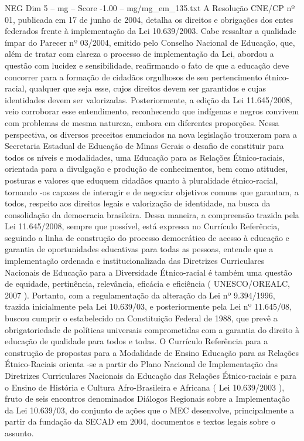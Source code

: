 \begin{textsample}{NEG Dim 5 – mg – Score -1.00 – mg/mg\_em\_135.txt}
A Resolução CNE/CP nº 01, publicada em 17 de junho de 2004, detalha os direitos e obrigações dos entes federados frente à implementação da Lei 10.639/2003.
Cabe ressaltar a qualidade ímpar do Parecer nº 03/2004, emitido pelo Conselho Nacional de Educação, que, além de tratar com clareza o processo de implementação da Lei, abordou a questão com lucidez e sensibilidade, reafirmando o fato de que a educação deve concorrer para a formação de cidadãos orgulhosos de seu pertencimento étnico-racial, qualquer que seja esse, cujos direitos devem ser garantidos e cujas identidades devem ser valorizadas.
Posteriormente, a edição da Lei 11.645/2008, veio corroborar esse entendimento, reconhecendo que indígenas e negros convivem com problemas de mesma natureza, embora em diferentes proporções.
Nessa perspectiva, os diversos preceitos enunciados na nova legislação trouxeram para a Secretaria Estadual de Educação de Minas Gerais o desafio de constituir para todos os níveis e modalidades, uma Educação para as Relações Étnico-raciais, orientada para a divulgação e produção de conhecimentos, bem como atitudes, posturas e valores que eduquem cidadãos quanto à pluralidade étnico-racial, tornando -os capazes de interagir e de negociar objetivos comuns que garantam, a todos, respeito aos direitos legais e valorização de identidade, na busca da consolidação da democracia brasileira.
Dessa maneira, a compreensão trazida pela Lei 11.645/2008, sempre que possível, está expressa no Currículo Referência, seguindo a linha de construção do processo democrático de acesso à educação e garantia de oportunidades educativas para todas as pessoas, entende que a implementação ordenada e institucionalizada das Diretrizes Curriculares Nacionais de Educação para a Diversidade Étnico-racial é também uma questão de equidade, pertinência, relevância, eficácia e eficiência ( UNESCO/OREALC, 2007 ).
Portanto, com a regulamentação da alteração da Lei nº 9.394/1996, trazida inicialmente pela Lei 10.639/03, e posteriormente pela Lei nº 11.645/08, buscou cumprir o estabelecido na Constituição Federal de 1988, que prevê a obrigatoriedade de políticas universais comprometidas com a garantia do direito à educação de qualidade para todos e todas.
O Currículo Referência para a construção de propostas para a Modalidade de Ensino Educação para as Relações Étnico-Raciais orienta -se a partir do Plano Nacional de Implementação das Diretrizes Curriculares Nacionais da Educação das Relações Étnico-raciais e para o Ensino de História e Cultura Afro-Brasileira e Africana ( Lei 10.639/2003 ), fruto de seis encontros denominados Diálogos Regionais sobre a Implementação da Lei 10.639/03, do conjunto de ações que o MEC desenvolve, principalmente a partir da fundação da SECAD em 2004, documentos e textos legais sobre o assunto.

\end{textsample}

